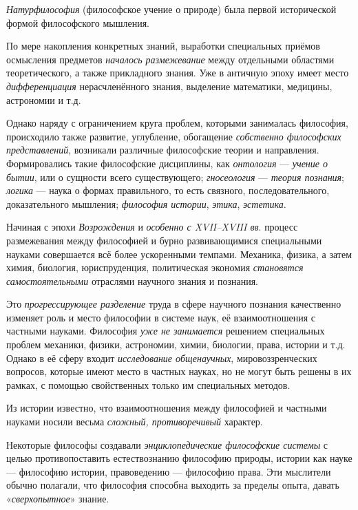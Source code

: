 \documentclass[a4paper,14pt,russian]{extreport}
\begin{document}
\emph{Натурфилософия} (философское учение о природе) была первой исторической формой философского мышления.

По мере накопления конкретных знаний, выработки специальных приёмов осмысления предметов \emph{началось размежевание} между отдельными областями теоретического, а также прикладного знания. Уже в античную эпоху имеет место \emph{дифференциация} нерасчленённого знания, выделение математики, медицины, астрономии и т.д.

Однако наряду с ограничением круга проблем, которыми занималась философия, происходило также развитие, углубление, обогащение \emph{собственно философских представлений}, возникали различные философские теории и направления. Формировались такие философские дисциплины, как \emph{онтология} --- \emph{учение о бытии}, или о сущности всего существующего; \emph{гносеология} --- \emph{теория познания}; \emph{логика} --- наука о формах правильного, то есть связного, последовательного, доказательного мышления; \emph{философия истории}, \emph{этика}, \emph{эстетика}.

Начиная с эпохи \emph{Возрождения} и \emph{особенно с XVII--XVIII вв}. процесс размежевания между философией и бурно развивающимися специальными науками совершается всё более ускоренными темпами. Механика, физика, а затем химия, биология, юриспруденция, политическая экономия \emph{становятся самостоятельными} отраслями научного знания и познания.

Это \emph{прогрессирующее разделение} труда в сфере научного познания качественно изменяет роль и место философии в системе наук, её взаимоотношения с частными науками. Философия \emph{уже не занимается} решением специальных проблем механики, физики, астрономии, химии, биологии, права, истории и т.д. Однако в её сферу входит \emph{исследование общенаучных}, мировоззренческих вопросов, которые имеют место в частных науках, но не могут быть решены в их рамках, с помощью свойственных только им специальных методов.

Из истории известно, что взаимоотношения между философией и частными науками носили весьма \emph{сложный, противоречивый} характер.

Некоторые философы создавали \emph{энциклопедические философские системы} с целью противопоставить естествознанию философию природы, истории как науке --- философию истории, правоведению --- философию права. Эти мыслители обычно полагали, что философия способна выходить за пределы опыта, давать «\emph{сверхопытное}» знание.
\end{document}
